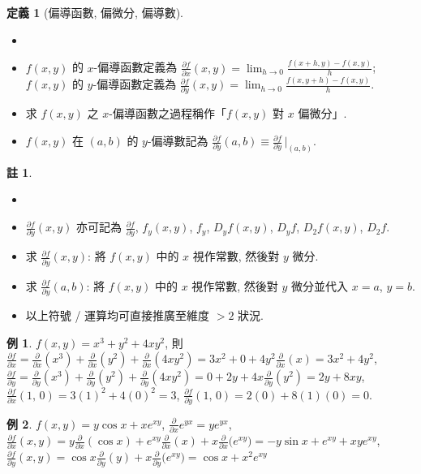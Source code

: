 \documentclass[12pt]{extarticle}
\newcommand{\ds}{\displaystyle}
\theoremstyle{definition}
\newtheorem*{dfn}{定義}
\newtheorem*{ex}{例}
\newtheorem*{rmk}{註}
\newcommand{\pdiff}[2]{\frac{\partial #1}{\partial #2}}
\begin{document}
\begin{dfn}[偏導函數, 偏微分, 偏導數]
  \begin{itemize}\setlength{\itemsep}{0pt}
    \item[]
    \item $\ds f(x, y)$ 的 $x$-偏導函數定義為 $\ds\pdiff{f}{x}(x, y) = \lim_{h\to 0}\frac{f(x + h, y) - f(x, y)}{h}$; $\ds f(x, y)$ 的 $y$-偏導函數定義為 $\ds\pdiff{f}{y}(x,y) = \lim_{h\to 0}\frac{f(x, y + h) - f(x, y)}{h}$. 
    \item 求 $f(x, y)$ 之 $x$-偏導函數之過程稱作「$\ds f(x, y)$ 對 $x$ 偏微分」. 
    \item $\ds f(x, y)$ 在 $(a, b)$ 的 $y$-偏導數記為 $\ds\pdiff{f}{y}(a,b)\equiv\pdiff{f}{y}\,\bigg|_{(a,b)}$. 
  \end{itemize}
\end{dfn}
\begin{rmk}
  \begin{itemize}\setlength{\itemsep}{0pt}
    \item[]
    \item $\ds\pdiff{f}{y}(x,y)$ 亦可記為 $\ds\pdiff{f}{y}$, $\ds f_y(x,y)$, $\ds f_y$, $\ds D_yf(x,y)$, $\ds D_yf$, $D_2 f(x,y)$, $D_2 f$. 
    \item 求 $\ds\pdiff{f}{y}(x, y)$:  將 $f(x, y)$ 中的 $x$ 視作常數, 然後對 $y$ 微分. 
    \item 求 $\ds\pdiff{f}{y}(a, b)$:  將 $f(x, y)$ 中的 $x$ 視作常數, 然後對 $y$ 微分並代入 $x = a$, $y = b$. 
    \item 以上符號 / 運算均可直接推廣至維度 $> 2$ 狀況. 
  \end{itemize}
\end{rmk}

\begin{ex}
  $\ds f(x,y) = x^3 + y^2 + 4xy^2$, 則 $\ds\pdiff{f}{x} = \pdiff{}{x}(x^3) + \pdiff{}{x}(y^2) + \pdiff{}{x}(4xy^2) = 3x^2 + 0 + 4y^2\pdiff{}{x}(x) = 3x^2 + 4y^2$, $\ds\pdiff{f}{y} = \pdiff{}{y}(x^3) + \pdiff{}{y}(y^2) +\pdiff{}{y}(4xy^2) = 0 + 2y + 4x\pdiff{}{y}(y^2) = 2y + 8xy$, $\ds\pdiff{f}{x}(1,\,0) = 3(1)^2 + 4(0)^2 = 3$, $\ds\pdiff{f}{y}(1,\,0) = 2(0) + 8(1)(0) = 0$. 
\end{ex}

\begin{ex}
  $\ds f(x,y) = y\cos x + xe^{xy}$, $\ds\pdiff{}{x} e^{yx}=y e^{yx}$, $\ds\pdiff{f}{x}(x,y) = y\pdiff{}{x}(\cos x) + e^{xy}\pdiff{}{x}(x) + x\pdiff{}{x}\big(e^{xy}\big) = -y\sin x + e^{xy} + x y e^{xy}$, $\ds\pdiff{f}{y}(x,y) = \cos x\pdiff{}{y}(y) + x\pdiff{}{y}\big(e^{xy}\big) = \cos x + x^2e^{xy}$
\end{ex}
\end{document}
